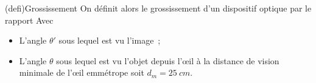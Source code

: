 \documentclass[../../main/main.tex]{subfiles}
\begin{document}
\begin{tcbraster}[raster columns=3, raster equal height=rows]
	\begin{tcb}[label=def_gross, raster multicolumn=2, sidebyside](defi){Grossissement}
		On définit alors le grossissement d'un dispositif optique par le rapport
		Avec
		\begin{itemize}[label=$\diamond$, leftmargin=10pt]
			\item L'angle $\theta'$ sous lequel est vu l'image~;
			\item L'angle $\theta$ sous lequel est vu l'objet depuis l'œil à la
			      distance de vision minimale de l'œil emmétrope soit $d_m
				      = \SI{25}{cm}$.
		\end{itemize}
		\tcblower
		\begin{center}
			\label{thetaobj}
		\end{center}
		\begin{center}

\end{center}
\end{tcb}
\end{tcbraster}
\end{document}
